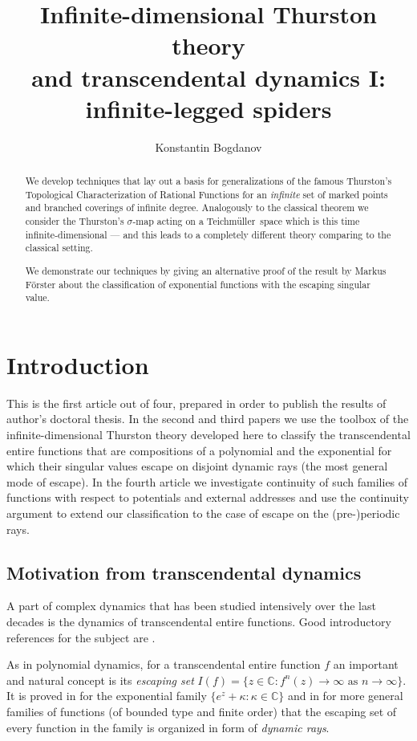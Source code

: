 \documentclass[10pt,reqno,a4paper]{amsart}
\title{Infinite-dimensional Thurston theory\\and transcendental dynamics I:\\infinite-legged spiders}
\author{Konstantin Bogdanov}
\numberwithin{figure}{section}
\numberwithin{equation}{section}
\newcommand{\tei}{Teichm\"uller}
\begin{document}
	
\begin{abstract}
	We develop techniques that lay out a basis for generalizations of the famous Thurston's Topological Characterization of Rational Functions for an \emph{infinite} set of marked points and branched coverings of infinite degree. Analogously to the classical theorem we consider the Thurston's $\sigma$-map acting on a \tei\ space which is this time infinite-dimensional --- and this leads to a completely different theory comparing to the classical setting.
	
	We demonstrate our techniques by giving an alternative proof of the result by Markus F\"orster about the classification of exponential functions with the escaping singular value.
\end{abstract}

\maketitle
	
\tableofcontents



\section{Introduction}

This is the first article out of four, prepared in order to publish the results of author's doctoral thesis. In the second and third papers we use the toolbox of the infinite-dimensional Thurston theory developed here to classify the transcendental entire functions that are compositions of a polynomial and the exponential for which their singular values escape on disjoint dynamic rays (the most general mode of escape). In the fourth article we investigate continuity of such families of functions with respect to potentials and external addresses and use the continuity argument to extend our classification to the case of escape on the (pre-)periodic rays.

\subsection*{Motivation from transcendental dynamics}
A part of complex dynamics that has been studied intensively over the last decades is the dynamics of transcendental entire functions. Good introductory references for the subject are \cite{ErLyu,DS-Transcendental}.

As in polynomial dynamics, for a transcendental entire function $f$ an important and natural concept is its \emph{escaping set} $I(f)=\{z\in\mathbb{C}: f^n(z)\to\infty\text{ as }n\to\infty\}$. It is proved in \cite{SZ-Escaping} for the exponential family $\{e^z+\kappa: \kappa\in\mathbb{C}\}$ and in \cite{RRRS} for more general families of functions (of bounded type and finite order) that the escaping set of every function in the family is organized in form of \emph{dynamic rays}.
\end{document}
